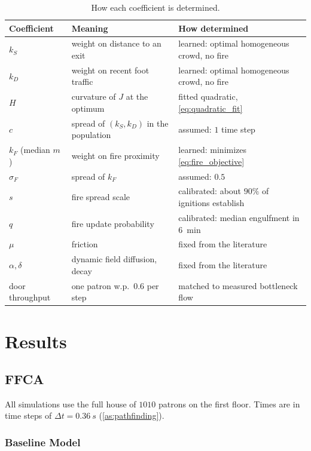 \documentclass[14pt]{article}
\theoremstyle{definition}
\begin{document}
\begin{table}[H]
  \centering
  \caption{How each coefficient is determined.}
  \label{tab:coefficients}
  \small
  \begin{tabular}{lll}
    \toprule
    Coefficient & Meaning & How determined \\
    \midrule
    $k_S$ & weight on distance to an exit & learned: optimal homogeneous crowd, no fire \\
    $k_D$ & weight on recent foot traffic & learned: optimal homogeneous crowd, no fire \\
    $H$ & curvature of $J$ at the optimum & fitted quadratic, \cref{eq:quadratic_fit} \\
    $c$ & spread of $(k_S, k_D)$ in the population & assumed: $1$ time step \\
    $k_F$ (median $m$) & weight on fire proximity & learned: minimizes \cref{eq:fire_objective} \\
    $\sigma_F$ & spread of $k_F$ & assumed: $0.5$ \\
    $s$ & fire spread scale & calibrated: about $90\%$ of ignitions establish \\
    $q$ & fire update probability & calibrated: median engulfment in \SI{6}{min} \\
    $\mu$ & friction & fixed from the literature \\
    $\alpha, \delta$ & dynamic field diffusion, decay & fixed from the literature \\
    door throughput & one patron w.p.\ $0.6$ per step & matched to measured bottleneck flow \\
    \bottomrule
  \end{tabular}
\end{table}

\newpage
\section{Results}
\subsection{FFCA}
All simulations use the full house of $1010$ patrons on the first floor. Times are in
time steps of $\Delta t = \SI{0.36}{s}$ (\cref{as:pathfinding}).

\subsubsection{Baseline Model}\label{sec:results_baseline}
\end{document}
